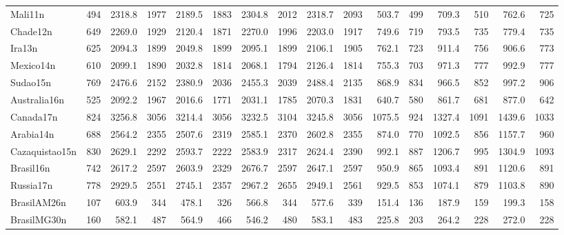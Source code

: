 \begin{landscape}
\begin{table}[htb]
{\begin{tabular}{@{}lr|rr|rr|rr|rr|rr|rr|rr@{}}
Mali11n&494&2318.8&1977&2189.5&1883&2304.8&2012&2318.7&2093&503.7&499&709.3&510&762.6&725\\
Chade12n&649&2269.0&1929&2120.4&1871&2270.0&1996&2203.0&1917&749.6&719&793.5&735&779.4&735\\
Ira13n&625&2094.3&1899&2049.8&1899&2095.1&1899&2106.1&1905&762.1&723&911.4&756&906.6&773\\
Mexico14n&610&2099.1&1890&2032.8&1814&2068.1&1794&2126.4&1814&755.3&703&971.3&777&992.9&777\\
Sudao15n&769&2476.6&2152&2380.9&2036&2455.3&2039&2488.4&2135&868.9&834&966.5&852&997.2&906\\
Australia16n&525&2092.2&1967&2016.6&1771&2031.1&1785&2070.3&1831&640.7&580&861.7&681&877.0&642\\
Canada17n&824&3256.8&3056&3214.4&3056&3232.5&3104&3245.8&3056&1075.5&924&1327.4&1091&1439.6&1033\\
Arabia14n&688&2564.2&2355&2507.6&2319&2585.1&2370&2602.8&2355&874.0&770&1092.5&856&1157.7&960\\
Cazaquistao15n&830&2629.1&2292&2593.7&2222&2583.9&2317&2624.4&2390&992.1&887&1206.7&995&1304.9&1093\\
Brasil16n&742&2617.2&2597&2603.9&2329&2676.7&2597&2647.1&2597&950.9&865&1093.4&891&1120.6&891\\
Russia17n&778&2929.5&2551&2745.1&2357&2967.2&2655&2949.1&2561&929.5&853&1074.1&879&1103.8&890\\
BrasilAM26n&107&603.9&344&478.1&326&566.8&344&577.6&339&151.4&136&187.9&159&199.3&158\\
BrasilMG30n&160&582.1&487&564.9&466&546.2&480&583.1&483&225.8&203&264.2&228&272.0&228\\
\bottomrule
\end{tabular}
}
\end{table}
\end{landscape}
